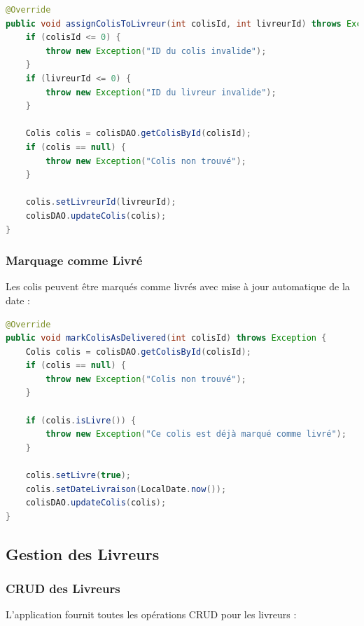 \documentclass{rapportENSIAS}
\begin{document}
\begin{lstlisting}[language=Java, caption=Assignation de colis]
@Override
public void assignColisToLivreur(int colisId, int livreurId) throws Exception {
    if (colisId <= 0) {
        throw new Exception("ID du colis invalide");
    }
    if (livreurId <= 0) {
        throw new Exception("ID du livreur invalide");
    }
    
    Colis colis = colisDAO.getColisById(colisId);
    if (colis == null) {
        throw new Exception("Colis non trouvé");
    }
    
    colis.setLivreurId(livreurId);
    colisDAO.updateColis(colis);
}
\end{lstlisting}

\subsubsection{Marquage comme Livr\'{e}}
Les colis peuvent \^{e}tre marqu\'{e}s comme livr\'{e}s avec mise \`{a} jour automatique de la date :

\begin{lstlisting}[language=Java, caption=Marquage comme livr\'{e}]
@Override
public void markColisAsDelivered(int colisId) throws Exception {
    Colis colis = colisDAO.getColisById(colisId);
    if (colis == null) {
        throw new Exception("Colis non trouvé");
    }
    
    if (colis.isLivre()) {
        throw new Exception("Ce colis est déjà marqué comme livré");
    }
    
    colis.setLivre(true);
    colis.setDateLivraison(LocalDate.now());
    colisDAO.updateColis(colis);
}
\end{lstlisting}

\subsection{Gestion des Livreurs}

\subsubsection{CRUD des Livreurs}
L'application fournit toutes les op\'{e}rations CRUD pour les livreurs :
\end{document}
